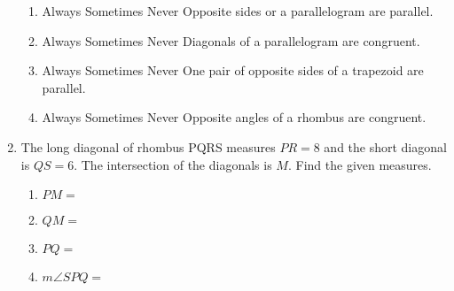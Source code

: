 \documentclass[12pt, twoside]{article}
\begin{document}
\begin{enumerate}
\begin{center}
  \end{center}
    \begin{enumerate}
      \item Always \quad Sometimes \quad  Never \quad Opposite sides or a parallelogram are parallel. \vspace{0.25cm}
      \item Always \quad Sometimes \quad  Never \quad Diagonals of a parallelogram are congruent. \vspace{0.25cm}
      \item Always \quad Sometimes \quad  Never \quad One pair of opposite sides of a trapezoid are parallel. \vspace{0.25cm}
      \item Always \quad Sometimes \quad  Never \quad Opposite angles of a rhombus are congruent.
    \end{enumerate}

  \item The long diagonal of rhombus PQRS measures $PR=8$ and the short diagonal is $QS=6$. The intersection of the diagonals is $M$. Find the given measures.\vspace{0.25cm}
    \begin{multicols}{2}
      \begin{enumerate}
        \item $PM=$ \vspace{0.5cm}
        \item $QM=$ \vspace{0.5cm}
        \item $PQ=$ \vspace{0.5cm}
        \item $m\angle SPQ=$\vspace{1.5cm}
      \end{enumerate}
    \end{multicols}

\end{enumerate}
\end{document}
